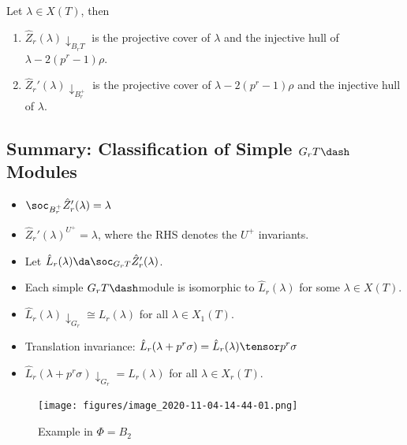 \begin{proposition}[?]

Let \(\lambda \in X(T)\), then

\begin{enumerate}
\def\labelenumi{\arabic{enumi}.}
\item
  \(\hat{Z}_r (\lambda) \downarrow_{B_r T}\) is the projective cover of
  \(\lambda\) and the injective hull of \(\lambda - 2(p^r-1)\rho\).
\item
  \(\hat{Z}_r' (\lambda) \downarrow_{B_r^+}\) is the projective cover of
  \(\lambda - 2(p^r-1)\rho\) and the injective hull of \(\lambda\).
\end{enumerate}

\end{proposition}

\hypertarget{summary-classification-of-simple-g_r-tdashmodules}{%
\subsection{\texorpdfstring{Summary: Classification of Simple
\(G_r T\dash\)Modules}{Summary: Classification of Simple G\_r T\textbackslash dashModules}}\label{summary-classification-of-simple-g_r-tdashmodules}}

\begin{itemize}
\tightlist
\item
  \(\soc_{B_r^+} \hat{Z}_r '(\lambda) = \lambda\)
\item
  \(\hat{Z}_r ' (\lambda) ^{U^+} = \lambda\), where the RHS denotes the
  \(U^+\) invariants.
\item
  Let \(\hat{L}_r(\lambda) \da \soc_{G_r T} \hat{Z}_r' (\lambda)\).
\item
  Each simple \(G_r T\dash\)module is isomorphic to
  \(\hat{L}_r (\lambda)\) for some \(\lambda\in X(T)\).
\item
  \(\hat{L}_r(\lambda) \downarrow_{G_r} \cong L_r (\lambda)\) for all
  \(\lambda \in X_1(T)\).
\item
  Translation invariance:
  \(\hat{L}_r(\lambda + p^r\sigma) = \hat{L}_r (\lambda) \tensor p^r\sigma\)
\item
  \(\hat{L}_r (\lambda + p^r \sigma) \downarrow_{G_r} = L_r(\lambda)\)
  for all \(\lambda \in X_r(T)\).
\end{itemize}

\begin{figure}
\centering
\texttt{[image: figures/image\_2020-11-04-14-44-01.png]}
\caption{Example in \(\Phi = B_2\)}
\end{figure}

